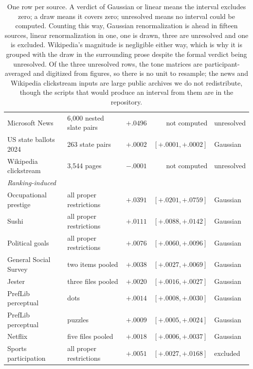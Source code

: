 \documentclass[11pt]{article}
\begin{document}
\begin{table}[ht]
\begin{tabular}{llrrl}
Microsoft News & 6{,}000 nested slate pairs & $+.0496$ & not computed & unresolved \\
US state ballots 2024 & 263 state pairs & $+.0002$ & $[+.0001, +.0002]$ & Gaussian\footnotemark[11] \\
Wikipedia clickstream & 3{,}544 pages & $-.0001$ & not computed & unresolved \\
\midrule
\multicolumn{5}{l}{\emph{Ranking-induced}} \\
Occupational prestige & all proper restrictions & $+.0391$ & $[+.0201, +.0759]$ & Gaussian \\
Sushi & all proper restrictions & $+.0111$ & $[+.0088, +.0142]$ & Gaussian \\
Political goals & all proper restrictions & $+.0076$ & $[+.0060, +.0096]$ & Gaussian \\
General Social Survey & two items pooled\footnotemark[13] & $+.0038$ & $[+.0027, +.0069]$ & Gaussian \\
Jester & three files pooled\footnotemark[13] & $+.0020$ & $[+.0016, +.0027]$ & Gaussian \\
PrefLib perceptual & dots & $+.0014$ & $[+.0008, +.0030]$ & Gaussian \\
PrefLib perceptual & puzzles & $+.0009$ & $[+.0005, +.0024]$ & Gaussian \\
Netflix & five files pooled\footnotemark[13] & $+.0018$ & $[+.0006, +.0037]$ & Gaussian \\
Sports participation & all proper restrictions & $+.0051$ & $[+.0027, +.0168]$ & excluded\footnotemark[12] \\
\bottomrule
\end{tabular}
\caption{One row per source. A verdict of Gaussian or linear means the interval excludes zero;
a draw means it covers zero; unresolved means no interval could be computed. Counting this way,
Gaussian renormalization is ahead in fifteen sources, linear renormalization in one, one is
drawn, three are unresolved and one is excluded. Wikipedia's magnitude is negligible either way,
which is why it is grouped with the draw in the surrounding prose despite the formal verdict
being unresolved. Of the three unresolved rows, the tone matrices are participant-averaged and
digitized from figures, so there is no unit to resample; the news and Wikipedia clickstream
inputs are large public archives we do not redistribute, though the scripts that would produce
an interval from them are in the repository.}
\label{tab:bysource}
\end{table}
\end{document}

